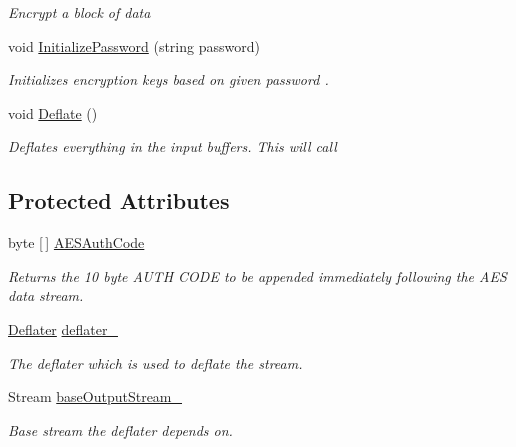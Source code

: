 \begin{DoxyCompactItemize}
\begin{DoxyCompactList}\small\item\em Encrypt a block of data \end{DoxyCompactList}\item 
void \hyperlink{class_i_c_sharp_code_1_1_sharp_zip_lib_1_1_zip_1_1_compression_1_1_streams_1_1_deflater_output_stream_a28127c5846671a1e94619d7ddf99d7a0}{Initialize\+Password} (string password)
\begin{DoxyCompactList}\small\item\em Initializes encryption keys based on given {\itshape password} . \end{DoxyCompactList}\item 
void \hyperlink{class_i_c_sharp_code_1_1_sharp_zip_lib_1_1_zip_1_1_compression_1_1_streams_1_1_deflater_output_stream_acc6796fde3f52f8d178fcb1cb3bf7085}{Deflate} ()
\begin{DoxyCompactList}\small\item\em Deflates everything in the input buffers. This will call \end{DoxyCompactList}\end{DoxyCompactItemize}
\subsection*{Protected Attributes}
\begin{DoxyCompactItemize}
\item 
byte \mbox{[}$\,$\mbox{]} \hyperlink{class_i_c_sharp_code_1_1_sharp_zip_lib_1_1_zip_1_1_compression_1_1_streams_1_1_deflater_output_stream_ad2a37d23b4c639208fed5a62b4f81cf9}{A\+E\+S\+Auth\+Code}
\begin{DoxyCompactList}\small\item\em Returns the 10 byte A\+U\+TH C\+O\+DE to be appended immediately following the A\+ES data stream. \end{DoxyCompactList}\item 
\hyperlink{class_i_c_sharp_code_1_1_sharp_zip_lib_1_1_zip_1_1_compression_1_1_deflater}{Deflater} \hyperlink{class_i_c_sharp_code_1_1_sharp_zip_lib_1_1_zip_1_1_compression_1_1_streams_1_1_deflater_output_stream_aabcc4442300144c41a6358b76aee9218}{deflater\+\_\+}
\begin{DoxyCompactList}\small\item\em The deflater which is used to deflate the stream. \end{DoxyCompactList}\item 
Stream \hyperlink{class_i_c_sharp_code_1_1_sharp_zip_lib_1_1_zip_1_1_compression_1_1_streams_1_1_deflater_output_stream_acda0a7cd7c275342feece60b10027671}{base\+Output\+Stream\+\_\+}
\begin{DoxyCompactList}\small\item\em Base stream the deflater depends on. \end{DoxyCompactList}\end{DoxyCompactItemize}
